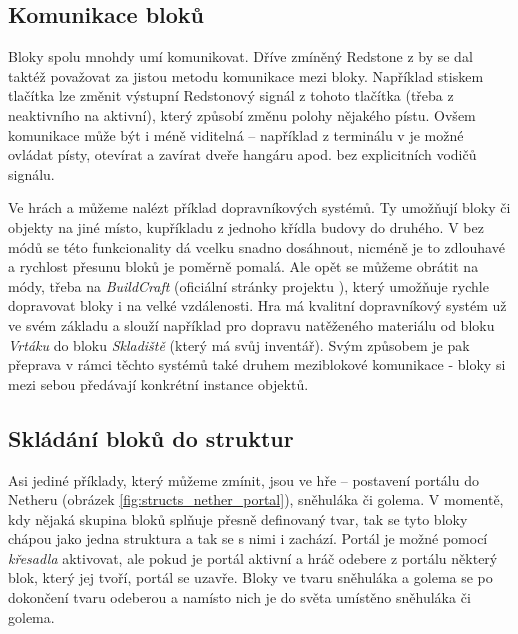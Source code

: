 \subsection{Komunikace bloků}
Bloky spolu mnohdy umí komunikovat. Dříve zmíněný Redstone z  by se dal taktéž považovat za jistou metodu komunikace mezi bloky. Například stiskem tlačítka lze změnit výstupní Redstonový signál z tohoto tlačítka (třeba z neaktivního na aktivní), který způsobí změnu polohy nějakého pístu. Ovšem komunikace může být i méně viditelná -- například z terminálu v \SE{} je možné ovládat písty, otevírat a zavírat dveře hangáru apod. bez explicitních vodičů signálu.

Ve hrách \MC{} a \SE{} můžeme nalézt příklad dopravníkových systémů. Ty umožňují  bloky či objekty na jiné místo, kupříkladu z jednoho křídla budovy do druhého. V  bez módů se této funkcionality dá vcelku snadno dosáhnout, nicméně je to zdlouhavé a rychlost přesunu bloků je poměrně pomalá. Ale opět se můžeme obrátit na módy, třeba na \textit{BuildCraft} (oficiální stránky projektu \citep{buildcraft}), který umožňuje rychle dopravovat bloky i na velké vzdálenosti. Hra \SE{} má kvalitní dopravníkový systém už ve svém základu a slouží například pro dopravu natěženého materiálu od bloku \textit{Vrtáku} do bloku \textit{Skladiště} (který má svůj inventář). Svým způsobem je pak přeprava v rámci těchto systémů také druhem meziblokové komunikace - bloky si mezi sebou předávají konkrétní instance objektů.

\subsection{Skládání bloků do struktur}
Asi jediné příklady, který můžeme zmínit, jsou ve hře \MC{} -- postavení portálu do Netheru (obrázek \ref{fig:structs_nether_portal}), sněhuláka či golema. V momentě, kdy nějaká skupina bloků splňuje přesně definovaný tvar, tak se tyto bloky chápou jako jedna struktura a tak se s nimi i zachází. Portál je možné pomocí \textit{křesadla} aktivovat, ale pokud je portál aktivní a hráč odebere z portálu některý blok, který jej tvoří, portál se uzavře. Bloky ve tvaru sněhuláka a golema se po dokončení tvaru odeberou a namísto nich je do světa umístěno \NPC{} sněhuláka či golema.

